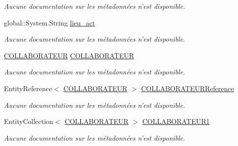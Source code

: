 \begin{DoxyCompactItemize}
\begin{DoxyCompactList}\small\item\em Aucune documentation sur les métadonnées n'est disponible. \end{DoxyCompactList}\item 
global\-::\-System.\-String \hyperlink{class_model_1_1_a_c_t_i_v_i_t_e___c_o_m_p_l_e_m_e_n_t_a_i_r_e_a730e1eac8f9fafbb0f48672688609f5e}{lieu\-\_\-act}
\begin{DoxyCompactList}\small\item\em Aucune documentation sur les métadonnées n'est disponible. \end{DoxyCompactList}\item 
\hyperlink{class_model_1_1_c_o_l_l_a_b_o_r_a_t_e_u_r}{C\-O\-L\-L\-A\-B\-O\-R\-A\-T\-E\-U\-R} \hyperlink{class_model_1_1_a_c_t_i_v_i_t_e___c_o_m_p_l_e_m_e_n_t_a_i_r_e_a0406f3c3e100219c6474603c5c5a6841}{C\-O\-L\-L\-A\-B\-O\-R\-A\-T\-E\-U\-R}
\begin{DoxyCompactList}\small\item\em Aucune documentation sur les métadonnées n'est disponible. \end{DoxyCompactList}\item 
Entity\-Reference$<$ \hyperlink{class_model_1_1_c_o_l_l_a_b_o_r_a_t_e_u_r}{C\-O\-L\-L\-A\-B\-O\-R\-A\-T\-E\-U\-R} $>$ \hyperlink{class_model_1_1_a_c_t_i_v_i_t_e___c_o_m_p_l_e_m_e_n_t_a_i_r_e_af0414ca6acf19af2edf4faf25b69e347}{C\-O\-L\-L\-A\-B\-O\-R\-A\-T\-E\-U\-R\-Reference}
\begin{DoxyCompactList}\small\item\em Aucune documentation sur les métadonnées n'est disponible. \end{DoxyCompactList}\item 
Entity\-Collection$<$ \hyperlink{class_model_1_1_c_o_l_l_a_b_o_r_a_t_e_u_r}{C\-O\-L\-L\-A\-B\-O\-R\-A\-T\-E\-U\-R} $>$ \hyperlink{class_model_1_1_a_c_t_i_v_i_t_e___c_o_m_p_l_e_m_e_n_t_a_i_r_e_a5060b22b62f8398491d89da890ae8ce0}{C\-O\-L\-L\-A\-B\-O\-R\-A\-T\-E\-U\-R1}
\begin{DoxyCompactList}\small\item\em Aucune documentation sur les métadonnées n'est disponible. \end{DoxyCompactList}\item 

\end{DoxyCompactItemize}
